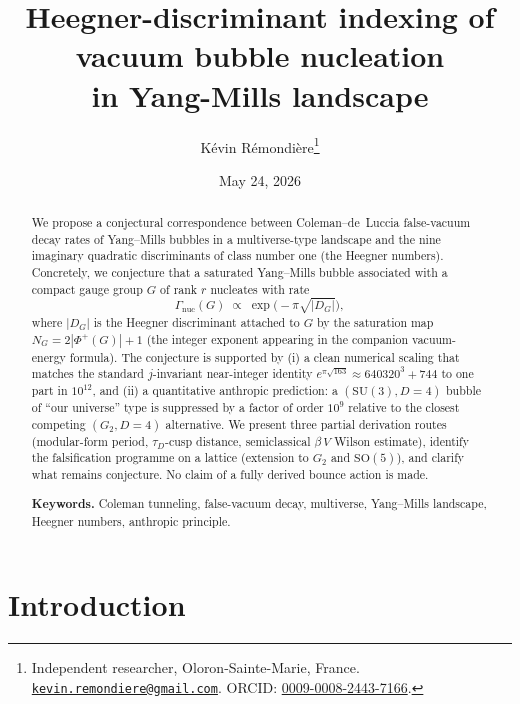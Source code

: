 \documentclass[11pt,a4paper]{article}
\title{Heegner-discriminant indexing of vacuum bubble nucleation\\ in Yang-Mills landscape}
\author{K\'evin R\'emondi\`ere\thanks{Independent researcher, Oloron-Sainte-Marie, France. \href{mailto:kevin.remondiere@gmail.com}{\texttt{kevin.remondiere@gmail.com}}. ORCID: \href{https://orcid.org/0009-0008-2443-7166}{0009-0008-2443-7166}.}}
\date{May 24, 2026}
\theoremstyle{plain}
\theoremstyle{definition}
\newcommand{\Phip}{\Phi^{+}}
\newcommand{\SU}{\mathrm{SU}}
\newcommand{\SO}{\mathrm{SO}}
\newcommand{\nuc}{\mathrm{nuc}}
\begin{document}
\maketitle

\begin{abstract}
We propose a conjectural correspondence between Coleman--de~Luccia false-vacuum decay rates of Yang--Mills bubbles in a multiverse-type landscape and the nine imaginary quadratic discriminants of class number one (the Heegner numbers). Concretely, we conjecture that a saturated Yang--Mills bubble associated with a compact gauge group $G$ of rank $r$ nucleates with rate
\[
\Gamma_{\nuc}(G) \;\propto\; \exp\bigl(-\pi\sqrt{|D_G|}\bigr),
\]
where $|D_G|$ is the Heegner discriminant attached to $G$ by the saturation map $N_G=2|\Phip(G)|+1$ (the integer exponent appearing in the companion vacuum-energy formula). The conjecture is supported by (i) a clean numerical scaling that matches the standard $j$-invariant near-integer identity $e^{\pi\sqrt{163}}\approx 640320^3+744$ to one part in $10^{12}$, and (ii) a quantitative anthropic prediction: a $(\SU(3),D{=}4)$ bubble of ``our universe'' type is suppressed by a factor of order $10^{9}$ relative to the closest competing $(G_2,D{=}4)$ alternative. We present three partial derivation routes (modular-form period, $\tau_D$-cusp distance, semiclassical $\beta\,V$ Wilson estimate), identify the falsification programme on a lattice (extension to $G_2$ and $\SO(5)$), and clarify what remains conjecture. No claim of a fully derived bounce action is made.

\medskip
\noindent\textbf{Keywords.} Coleman tunneling, false-vacuum decay, multiverse, Yang--Mills landscape, Heegner numbers, anthropic principle.
\end{abstract}

\bigskip

\begin{center}
\end{center}

\section{Introduction}\label{sec:intro}
\end{document}
